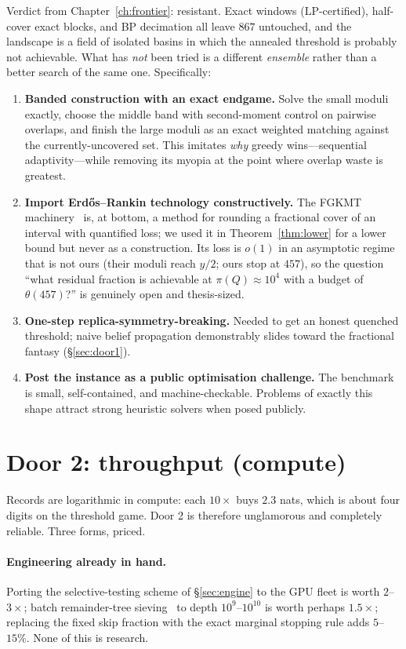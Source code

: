 Verdict from Chapter~\ref{ch:frontier}: resistant. Exact windows (LP-certified),
half-cover exact blocks, and BP decimation all leave $867$ untouched, and the
landscape is a field of isolated basins in which the annealed threshold is
probably not achievable. What has \emph{not} been tried is a different
\emph{ensemble} rather than a better search of the same one. Specifically:

\begin{enumerate}
\item \textbf{Banded construction with an exact endgame.} Solve the small moduli
exactly, choose the middle band with second-moment control on pairwise overlaps,
and finish the large moduli as an exact weighted matching against the
currently-uncovered set. This imitates \emph{why} greedy wins---sequential
adaptivity---while removing its myopia at the point where overlap waste is
greatest.
\item \textbf{Import Erd\H{o}s--Rankin technology constructively.} The
FGKMT machinery~\cite{FGKMT} is, at bottom, a method for rounding a fractional
cover of an interval with quantified loss; we used it in
Theorem~\ref{thm:lower} for a lower bound but never as a construction. Its loss
is $o(1)$ in an asymptotic regime that is not ours (their moduli reach $y/2$;
ours stop at $457$), so the question ``what residual fraction is achievable at
$\pi(Q)\approx10^{4}$ with a budget of $\theta(457)$?'' is genuinely open and
thesis-sized.
\item \textbf{One-step replica-symmetry-breaking.} Needed to get an honest
quenched threshold; naive belief propagation demonstrably slides toward the
fractional fantasy (\S\ref{sec:door1}).
\item \textbf{Post the instance as a public optimisation challenge.} The
benchmark is small, self-contained, and machine-checkable. Problems of exactly
this shape attract strong heuristic solvers when posed publicly.
\end{enumerate}

\section{Door 2: throughput (compute)}

Records are logarithmic in compute: each $10\times$ buys $2.3$ nats, which is
about four digits on the threshold game. Door 2 is therefore unglamorous and
completely reliable. Three forms, priced.

\paragraph{Engineering already in hand.} Porting the selective-testing scheme of
\S\ref{sec:engine} to the GPU fleet is worth $2$--$3\times$; batch
remainder-tree sieving~\cite{Bernstein} to depth $10^{9}$--$10^{10}$ is worth
perhaps $1.5\times$; replacing the fixed skip fraction with the exact marginal
stopping rule adds $5$--$15\%$. None of this is research.

